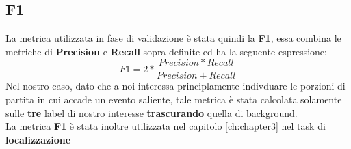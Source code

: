 \subsection{F1}
La metrica utilizzata in fase di validazione è stata quindi la \textbf{F1}, essa combina le metriche di \textbf{Precision} e \textbf{Recall} sopra definite ed ha la seguente espressione:
\begin{equation}
F1=2*\frac{Precision * Recall}{Precision + Recall}
\label{F1}
\end{equation}
Nel nostro caso, dato che a noi interessa principlamente indivduare le porzioni di partita in cui accade un evento saliente, tale metrica è stata calcolata solamente sulle \textbf{tre} label di nostro interesse \textbf{trascurando} quella di background.
\\La metrica \textbf{F1} è stata inoltre utilizzata nel capitolo \ref{ch:chapter3} nel task di \textbf{localizzazione}
